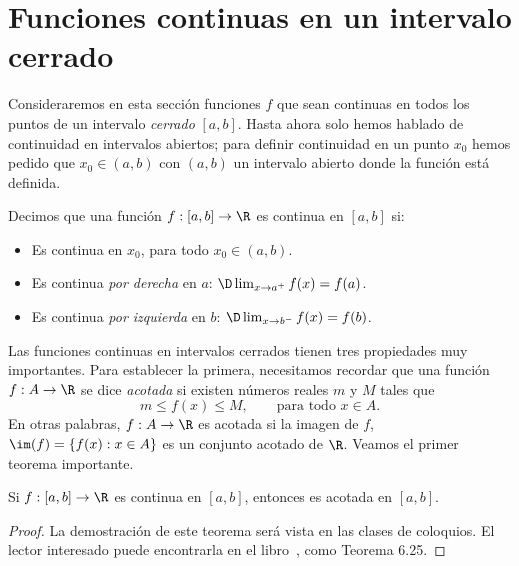 \begin{enumerate}

\end{enumerate}


    
\section{Funciones continuas en un intervalo cerrado}

Consideraremos en esta sección funciones $f$ que sean continuas en todos los puntos de un intervalo \emph{cerrado} $[a,b]$.
Hasta ahora solo hemos hablado de continuidad en intervalos abiertos; para definir continuidad en un punto $x_0$ hemos pedido que $x_0\in(a,b)$ con $(a,b)$ un intervalo abierto donde la función está definida.

\begin{definition}
Decimos que una función $f:[a,b]\to\R$ es continua en $[a,b]$ si:
\begin{itemize}
    \item Es continua en $x_0$, para todo $x_0\in(a,b)$.
    \item Es continua \emph{por derecha} en $a$: $\D\lim_{x\to a^+}f(x)=f(a)$.
    \item Es continua \emph{por izquierda} en $b$: $\D\lim_{x\to b^-}f(x)=f(b)$.
\end{itemize}
\end{definition}

Las funciones continuas en intervalos cerrados tienen tres propiedades muy importantes. Para establecer la primera, necesitamos recordar que una función $f:A\to\R$ se dice \emph{acotada} si existen números reales $m$ y $M$ tales que 
\[
m\le f(x) \le M, \qquad\text{para todo $x\in A$}.
\]
En otras palabras, $f:A\to\R$ es acotada si la imagen de $f$, $\im(f)=\{f(x):x\in A\}$ es un conjunto acotado de $\R$.
Veamos el primer teorema importante.

\begin{theorem}\label{T:continua->acotada}
    Si $f:[a,b]\to\R$ es continua en $[a,b]$, entonces es acotada en $[a,b]$.
\end{theorem}

\begin{proof}
    La demostración de este teorema será vista en las clases de coloquios. El lector interesado puede encontrarla en el libro~\cite{Noriega}, como Teorema 6.25.
\end{proof}

